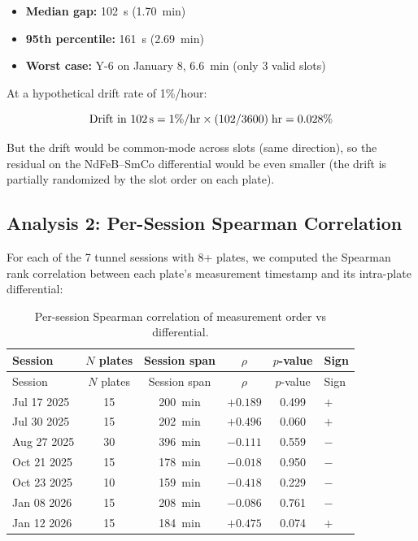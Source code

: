 \documentclass[11pt,letterpaper]{article}
\begin{document}
\begin{itemize}[nosep]
  \item \textbf{Median gap:} \SI{102}{\second} (\SI{1.70}{min})
  \item \textbf{95th percentile:} \SI{161}{\second} (\SI{2.69}{min})
  \item \textbf{Worst case:} Y-6 on January 8, \SI{6.6}{min} (only 3 valid slots)
\end{itemize}

At a hypothetical drift rate of 1\%/hour:

\begin{equation*}
\text{Drift in \SI{102}{\second}} = 1\%/\text{hr} \times (102/3600)\;\text{hr} = 0.028\%
\end{equation*}

But the drift would be common-mode across slots (same direction), so the
residual on the NdFeB--SmCo differential would be even smaller (the drift is
partially randomized by the slot order on each plate).

\subsection{Analysis 2: Per-Session Spearman Correlation}

For each of the 7 tunnel sessions with 8+ plates, we computed the Spearman rank
correlation between each plate's measurement timestamp and its intra-plate
differential:

\begin{longtable}{@{}lccccl@{}}
\caption{Per-session Spearman correlation of measurement order vs differential.}
\label{tab:wsd-spearman} \\
\toprule
Session & $N$ plates & Session span & $\rho$ & $p$-value & Sign \\
\midrule
\endfirsthead
\toprule
Session & $N$ plates & Session span & $\rho$ & $p$-value & Sign \\
\midrule
\endhead
Jul 17 2025 & 15 & \SI{200}{min} & $+0.189$ & 0.499 & $+$ \\
Jul 30 2025 & 15 & \SI{202}{min} & $+0.496$ & 0.060 & $+$ \\
Aug 27 2025 & 30 & \SI{396}{min} & $-0.111$ & 0.559 & $-$ \\
Oct 21 2025 & 15 & \SI{178}{min} & $-0.018$ & 0.950 & $-$ \\
Oct 23 2025 & 10 & \SI{159}{min} & $-0.418$ & 0.229 & $-$ \\
Jan 08 2026 & 15 & \SI{208}{min} & $-0.086$ & 0.761 & $-$ \\
Jan 12 2026 & 15 & \SI{184}{min} & $+0.475$ & 0.074 & $+$ \\
\bottomrule
\end{longtable}
\end{document}
